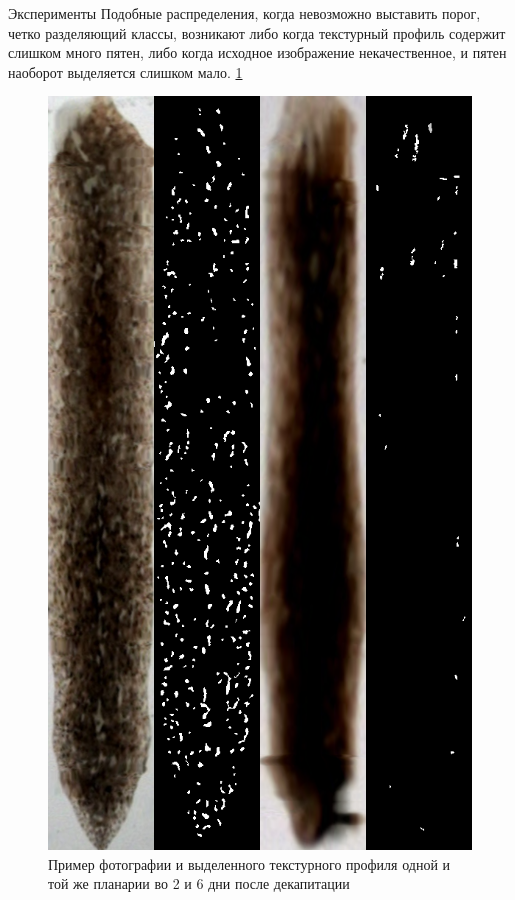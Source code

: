 \documentclass{article}
\begin{document}
\begin{section}{Эксперименты}
Подобные распределения, когда невозможно выставить порог, четко разделяющий классы, возникают либо когда текстурный профиль содержит слишком много пятен, либо когда исходное изображение некачественное, и пятен наоборот выделяется слишком мало. \ref{fig8}

\begin{figure}[H!]
\centering
\includegraphics[scale=0.3]{lessmore.png}
\caption{Пример фотографии и выделенного текстурного профиля одной и той же планарии во 2 и 6 дни после декапитации}
\label{fig8}
\end{figure}




\end{section}
\end{document}
